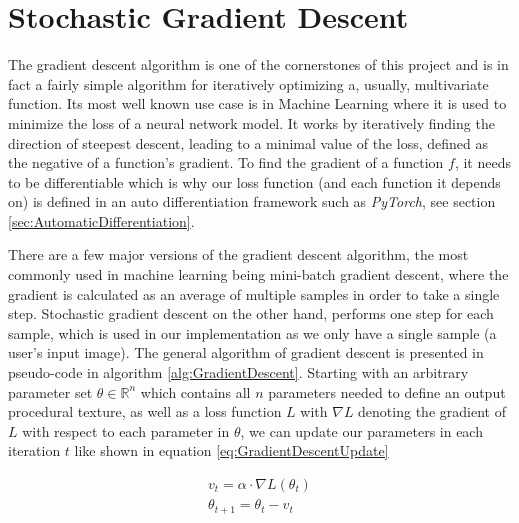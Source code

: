 

\section{Stochastic Gradient Descent}\label{sec:StochasticGradientDescent}

The gradient descent algorithm is one of the cornerstones of this project and is in fact a fairly simple algorithm for iteratively optimizing a, usually, multivariate function. Its most well known use case is in Machine Learning where it is used to minimize the loss of a neural network model. It works by iteratively finding the direction of steepest descent, leading to a minimal value of the loss, defined as the negative of a function's gradient. To find the gradient of a function $f$, it needs to be differentiable which is why our loss function (and each function it depends on) is defined in an auto differentiation framework such as \textit{PyTorch}, see section \ref{sec:AutomaticDifferentiation}.

There are a few major versions of the gradient descent algorithm, the most commonly used in machine learning being mini-batch gradient descent, where the gradient is calculated as an average of multiple samples in order to take a single step. Stochastic gradient descent on the other hand, performs one step for each sample, which is used in our implementation as we only have a single sample (a user's input image). The general algorithm of gradient descent is presented in pseudo-code in algorithm \ref{alg:GradientDescent}. Starting with an arbitrary parameter set $\theta \in \mathbb{R}^n$ which contains all $n$ parameters needed to define an output procedural texture, as well as a loss function $L$ with $\nabla L$ denoting the gradient of $L$ with respect to each parameter in $\theta$, we can update our parameters in each iteration $t$ like shown in equation \ref{eq:GradientDescentUpdate}

\begin{equation}\label{eq:GradientDescentUpdate}
    \begin{aligned}
    v_t = \alpha \cdot \nabla L(\theta_t) \\
    \theta_{t+1} = \theta_t - v_t
    \end{aligned}
\end{equation}

